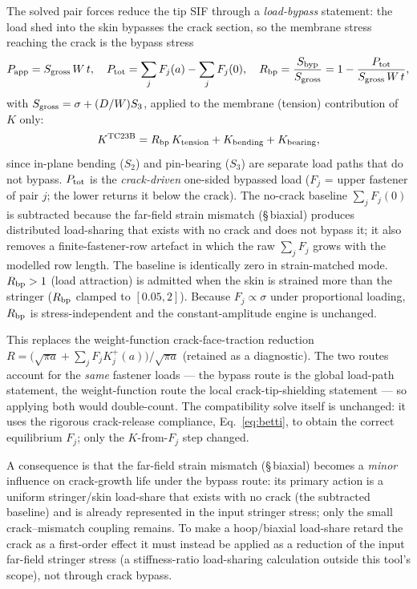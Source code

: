 \documentclass[11pt]{article}
\begin{document}
The solved pair forces reduce the tip SIF through a \emph{load-bypass}
statement: the load shed into the skin bypasses the crack section, so the
membrane stress reaching the crack is the bypass stress
\begin{equation}
  P_{\rm app}=S_{\rm gross}\,W\,t,\quad
  P_{\rm tot}=\sum_j F_j(a)-\sum_j F_j(0),\quad
  R_{\rm bp}=\frac{S_{\rm byp}}{S_{\rm gross}}
            =1-\frac{P_{\rm tot}}{S_{\rm gross}\,W\,t},
\end{equation}
with $S_{\rm gross}=\sigma+(D/W)S_3$, applied to the membrane (tension)
contribution of $K$ only:
\begin{equation}
  K^{\rm TC23B}=R_{\rm bp}\,K_{\rm tension}+K_{\rm bending}+K_{\rm bearing},
\end{equation}
since in-plane bending ($S_2$) and pin-bearing ($S_3$) are separate load
paths that do not bypass. $P_{\rm tot}$ is the \emph{crack-driven} one-sided
bypassed load ($F_j$ = upper fastener of pair $j$; the lower returns it below
the crack). The no-crack baseline $\sum_j F_j(0)$ is subtracted because the
far-field strain mismatch (\S\,biaxial) produces distributed load-sharing that
exists with no crack and does not bypass it; it also removes a
finite-fastener-row artefact in which the raw $\sum_j F_j$ grows with the
modelled row length. The baseline is identically zero in strain-matched mode.
$R_{\rm bp}>1$ (load attraction) is admitted when the skin is strained more
than the stringer ($R_{\rm bp}$ clamped to $[0.05,2]$). Because
$F_j\propto\sigma$ under proportional loading, $R_{\rm bp}$ is
stress-independent and the constant-amplitude engine is unchanged.

This replaces the weight-function crack-face-traction reduction
$R=\bigl(\sqrt{\pi a}+\sum_j F_j K^+_j(a)\bigr)/\sqrt{\pi a}$ (retained as a
diagnostic). The two routes account for the \emph{same} fastener loads --- the
bypass route is the global load-path statement, the weight-function route the
local crack-tip-shielding statement --- so applying both would double-count.
The compatibility solve itself is unchanged: it uses the rigorous
crack-release compliance, Eq.~\eqref{eq:betti}, to obtain the correct
equilibrium $F_j$; only the $K$-from-$F_j$ step changed.

A consequence is that the far-field strain mismatch (\S\,biaxial) becomes a
\emph{minor} influence on crack-growth life under the bypass route: its primary
action is a uniform stringer/skin load-share that exists with no crack (the
subtracted baseline) and is already represented in the input stringer stress;
only the small crack--mismatch coupling remains. To make a hoop/biaxial
load-share retard the crack as a first-order effect it must instead be applied
as a reduction of the input far-field stringer stress (a stiffness-ratio
load-sharing calculation outside this tool's scope), not through crack bypass.
\end{document}
